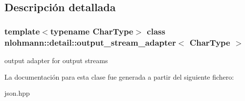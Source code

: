 \subsection{Descripción detallada}
\subsubsection*{template$<$typename Char\+Type$>$\newline
class nlohmann\+::detail\+::output\+\_\+stream\+\_\+adapter$<$ Char\+Type $>$}

output adapter for output streams 

La documentación para esta clase fue generada a partir del siguiente fichero\+:\begin{DoxyCompactItemize}
\item 
json.\+hpp\end{DoxyCompactItemize}
